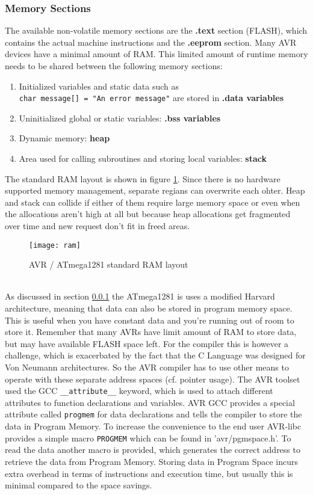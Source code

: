 \subsubsection{Memory Sections}
\label{memory}
The available non-volatile memory sections are the \textbf{.text} section (FLASH), which contains the actual machine instructions and the \textbf{.eeprom} section. Many AVR devices have a minimal amount of RAM. This limited amount of runtime memory needs to be shared between the following memory sections:
\begin{enumerate}
\item Initialized variables and static data such as\\ \verb+char message[] = "An error message"+ are stored in \textbf{.data variables}
\item Uninitialized global or static variables: \textbf{.bss variables}
\item Dynamic memory: \textbf{heap}
\item Area used for calling subroutines and storing local variables: \textbf{stack}
\end{enumerate}
The standard RAM layout is shown in figure \ref{fig:RAM}. Since there is no hardware supported memory management, separate regians can overwrite each ohter. Heap and stack can collide if either of them require large memory space or even when the allocations aren't high at all but because heap allocations get fragmented over time and new request don't fit in freed areas.
\begin{figure}[ht]
\centering
\texttt{[image: ram]}
\caption{AVR / ATmega1281 standard RAM layout}
\label{fig:RAM}
\end{figure}\\
As discussed in section \ref{memory} the ATmega1281 is uses a modified Harvard architecture, meaning that data can also be stored in program memory space. This is useful when you have constant data and you're running out of room to store it. Remember that many AVRs have limit amount of RAM to store data, but may have available FLASH space left. For the compiler this is however a challenge, which is exacerbated by the fact that the C Language was designed for Von Neumann architectures. So the AVR compiler has to use other means to operate with these separate address spaces (cf. pointer usage). The AVR toolset used the GCC \verb+__attribute__+ keyword, which is used to attach different attributes to function declarations and variables. AVR GCC provides a special attribute called \verb+progmem+ for data declarations and tells the compiler to store the data in Program Memory. To increase the convenience to the end user AVR-libc provides a simple macro \verb+PROGMEM+ which can be found in 'avr/pgmspace.h'. To read the data another macro is provided, which generates the correct address to retrieve the data from Program Memory. Storing data in Program Space incurs extra overhead in terms of instructions and execution time, but usually this is minimal compared to the space savings.\\

